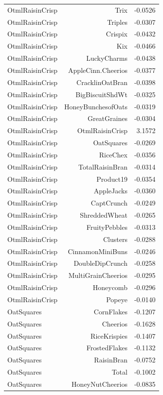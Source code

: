 \begin{longtable}{@{}lrr@{}}
OtmlRaisinCrisp & Trix & -0.0526 \\
OtmlRaisinCrisp & Triples & -0.0307 \\
OtmlRaisinCrisp & Crispix & -0.0432 \\
OtmlRaisinCrisp & Kix & -0.0466 \\
OtmlRaisinCrisp & LuckyCharms & -0.0438 \\
OtmlRaisinCrisp & AppleCinn.Cheerios & -0.0377 \\
OtmlRaisinCrisp & CracklinOatBran & -0.0398 \\
OtmlRaisinCrisp & BigBiscuitShdWt & -0.0325 \\
OtmlRaisinCrisp & HoneyBunchesofOats & -0.0319 \\
OtmlRaisinCrisp & GreatGraines & -0.0304 \\
OtmlRaisinCrisp & OtmlRaisinCrisp & 3.1572 \\
OtmlRaisinCrisp & OatSquares & -0.0269 \\
OtmlRaisinCrisp & RiceChex & -0.0356 \\
OtmlRaisinCrisp & TotalRaisinBran & -0.0314 \\
OtmlRaisinCrisp & Product19 & -0.0354 \\
OtmlRaisinCrisp & AppleJacks & -0.0360 \\
OtmlRaisinCrisp & CaptCrunch & -0.0249 \\
OtmlRaisinCrisp & ShreddedWheat & -0.0265 \\
OtmlRaisinCrisp & FruityPebbles & -0.0313 \\
OtmlRaisinCrisp & Clusters & -0.0288 \\
OtmlRaisinCrisp & CinnamonMiniBuns & -0.0246 \\
OtmlRaisinCrisp & DoubleDipCrunch & -0.0258 \\
OtmlRaisinCrisp & MultiGrainCheerios & -0.0295 \\
OtmlRaisinCrisp & Honeycomb & -0.0296 \\
OtmlRaisinCrisp & Popeye & -0.0140 \\
OatSquares & CornFlakes & -0.1207 \\
OatSquares & Cheerios & -0.1628 \\
OatSquares & RiceKrispies & -0.1407 \\
OatSquares & FrostedFlakes & -0.1132 \\
OatSquares & RaisinBran & -0.0752 \\
OatSquares & Total & -0.1002 \\
OatSquares & HoneyNutCheerios & -0.0835 \\

\end{longtable}
